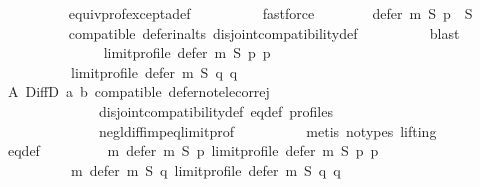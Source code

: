 \begin{isabellebody}
\ \ \ \ \ \ \ \ \isamarkupfalse%
\ equiv{\isacharunderscore}{\kern0pt}prof{\isacharunderscore}{\kern0pt}except{\isacharunderscore}{\kern0pt}a{\isacharunderscore}{\kern0pt}def\isanewline
\ \ \ \ \ \ \ \ \isamarkupfalse%
\ fastforce\isanewline
\ \ \ \ \ \ \isamarkupfalse%
\ {\isachardoublequoteopen}{\isacharparenleft}{\kern0pt}defer\ m\ S\ p{\isacharparenright}{\kern0pt}\ {\isasymsubseteq}\ S{\isachardoublequoteclose}\isanewline
\ \ \ \ \ \ \ \ \isamarkupfalse%
\ compatible\ defer{\isacharunderscore}{\kern0pt}in{\isacharunderscore}{\kern0pt}alts\ disjoint{\isacharunderscore}{\kern0pt}compatibility{\isacharunderscore}{\kern0pt}def\isanewline
\ \ \ \ \ \ \ \ \isamarkupfalse%
\ blast\isanewline
\ \ \ \ \ \ \isamarkupfalse%
\isanewline
\ \ \ \ \ \ \ \ {\isachardoublequoteopen}limit{\isacharunderscore}{\kern0pt}profile\ {\isacharparenleft}{\kern0pt}defer\ m\ S\ p{\isacharparenright}{\kern0pt}\ p\ {\isacharequal}{\kern0pt}\isanewline
\ \ \ \ \ \ \ \ \ \ limit{\isacharunderscore}{\kern0pt}profile\ {\isacharparenleft}{\kern0pt}defer\ m\ S\ q{\isacharparenright}{\kern0pt}\ q{\isachardoublequoteclose}\isanewline
\ \ \ \ \ \ \ \ \isamarkupfalse%
\ A\ DiffD{}\ a\ b\ compatible\ defer{\isacharunderscore}{\kern0pt}not{\isacharunderscore}{\kern0pt}elec{\isacharunderscore}{\kern0pt}or{\isacharunderscore}{\kern0pt}rej\isanewline
\ \ \ \ \ \ \ \ \ \ \ \ \ \ disjoint{\isacharunderscore}{\kern0pt}compatibility{\isacharunderscore}{\kern0pt}def\ eq{\isacharunderscore}{\kern0pt}def\ profiles\isanewline
\ \ \ \ \ \ \ \ \ \ \ \ \ \ negl{\isacharunderscore}{\kern0pt}diff{\isacharunderscore}{\kern0pt}imp{\isacharunderscore}{\kern0pt}eq{\isacharunderscore}{\kern0pt}limit{\isacharunderscore}{\kern0pt}prof\isanewline
\ \ \ \ \ \ \ \ \isamarkupfalse%
\ {\isacharparenleft}{\kern0pt}metis\ {\isacharparenleft}{\kern0pt}no{\isacharunderscore}{\kern0pt}types{\isacharcomma}{\kern0pt}\ lifting{\isacharparenright}{\kern0pt}{\isacharparenright}{\kern0pt}\isanewline
\ \ \ \ \ \ \isamarkupfalse%
\ eq{\isacharunderscore}{\kern0pt}def\ \isamarkupfalse%
\isanewline
\ \ \ \ \ \ \ \ {\isachardoublequoteopen}m{}\ {\isacharparenleft}{\kern0pt}defer\ m\ S\ p{\isacharparenright}{\kern0pt}\ {\isacharparenleft}{\kern0pt}limit{\isacharunderscore}{\kern0pt}profile\ {\isacharparenleft}{\kern0pt}defer\ m\ S\ p{\isacharparenright}{\kern0pt}\ p{\isacharparenright}{\kern0pt}\ {\isacharequal}{\kern0pt}\isanewline
\ \ \ \ \ \ \ \ \ \ m{}\ {\isacharparenleft}{\kern0pt}defer\ m\ S\ q{\isacharparenright}{\kern0pt}\ {\isacharparenleft}{\kern0pt}limit{\isacharunderscore}{\kern0pt}profile\ {\isacharparenleft}{\kern0pt}defer\ m\ S\ q{\isacharparenright}{\kern0pt}\ q{\isacharparenright}{\kern0pt}{\isachardoublequoteclose}\isanewline

\end{isabellebody}
